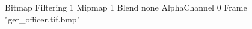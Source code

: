 {Bitmap
	{Filtering 1}
	{Mipmap 1}
	{Blend none}
	{AlphaChannel 0}
	{Frame "ger_officer.tif.bmp"}
}
